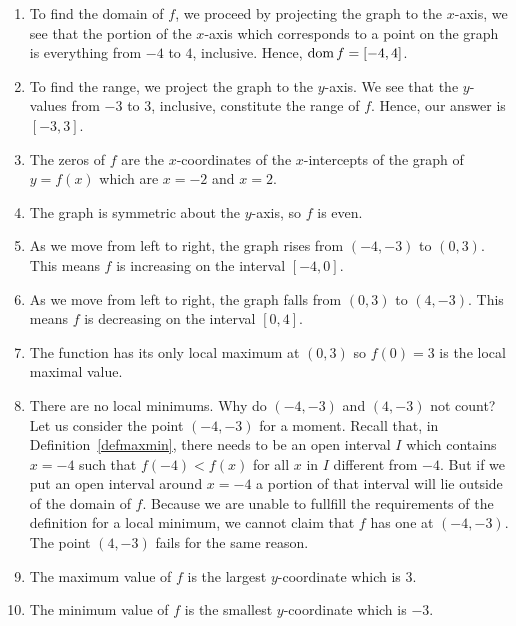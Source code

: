 \begin{example}
\begin{enumerate}
		\item  To find the domain of $f$, we proceed by projecting the graph to the $x$-axis, we see that the portion of the $x$-axis which corresponds to a point on the graph is everything from $-4$ to $4$, inclusive.  Hence,  $\text{dom}{\,} f=[-4,4]$.
		
		\item  To find the range, we project the graph to the $y$-axis.  We see that the $y$-values from $-3$ to $3$, inclusive, constitute the range of $f$.  Hence, our answer is $[-3,3]$.
		
		\item  The zeros of $f$ are the $x$-coordinates of the $x$-intercepts of the graph of $y=f(x)$ which are $x=-2$ and $x=2$.
		
		\item The graph is symmetric about the $y$-axis, so $f$ is even.
		
		\item  As we move from left to right, the graph rises from $(-4,-3)$ to $(0,3)$. This means $f$ is increasing on the interval $[-4,0]$.  
		
		\item  As we move from left to right, the graph falls from $(0,3)$ to $(4,-3)$.  This means $f$ is decreasing on the interval $[0,4]$.  
		
		\item  The function has its only local maximum at $(0,3)$ so $f(0) = 3$ is the local maximal value.
		
		\item  There are no local minimums.  Why do $(-4, -3)$ and $(4, -3)$ not count?  Let us consider the point $(-4, -3)$ for a moment.  Recall that, in Definition~\ref{defmaxmin}, there needs to be an open interval $I$ which contains $x = -4$ such that $f(-4) < f(x)$ for all $x$ in $I$ different from $-4$.  But if we put an open interval around $x= -4$ a portion of that interval will lie outside of the domain of $f$.  Because we are unable to fullfill the requirements of the definition for a local minimum, we cannot claim that $f$ has one at $(-4, -3)$.  The point $(4, -3)$ fails for the same reason.
		
		\item  The maximum value of $f$ is the largest $y$-coordinate which is $3$.
		
		\item  The minimum value of $f$ is the smallest $y$-coordinate which is $-3$.
		
	\end{enumerate}
	
\end{example}
\fi




